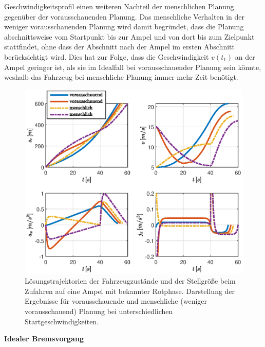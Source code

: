 Geschwindigkeitsprofil einen weiteren Nachteil der menschlichen Planung gegenüber der vorausschauenden Planung. Das menschliche Verhalten in der weniger vorausschauenden Planung wird damit begründet, dass die Planung abschnittsweise vom Startpunkt bis zur Ampel und von dort bis zum Zielpunkt stattfindet, ohne dass der Abschnitt nach der Ampel im ersten Abschnitt berücksichtigt wird. Dies hat zur Folge, dass die Geschwindigkeit $v(t_1)$ an der Ampel geringer ist, als sie im Idealfall bei vorausschauender Planung sein könnte, weshalb das Fahrzeug bei menschliche Planung immer mehr Zeit benötigt.
\begin{figure}[h] 
	\centering
	\includegraphics[width=\linewidth]{./Bilder/Ergebnisse/Geradeausfahrt/Ampel/v_5_v_15/svaj_zoomj.eps}
	\caption{Lösungstrajektorien der Fahrzeugzustände und der Stellgröße beim Zufahren auf eine Ampel mit bekannter Rotphase. Darstellung der Ergebnisse für vorausschauende und menschliche (weniger vorausschauend) Planung bei unterschiedlichen Startgeschwindigkeiten.}
	\label{fig:svaj_zoomj}
\end{figure} 

\textbf{Idealer Bremsvorgang}

